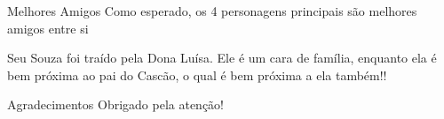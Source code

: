 \documentclass{beamer}
\begin{document}
\begin{frame}{Melhores Amigos}
    Como esperado, os 4 personagens principais são melhores amigos entre si
    
    Seu Souza foi traído pela Dona Luísa. Ele é um cara de família, enquanto ela é bem próxima ao pai do Cascão, o qual é bem próxima a ela também!!
\end{frame}

\begin{frame}{Agradecimentos}
\centering
Obrigado pela atenção!
\end{frame}
\end{document}
